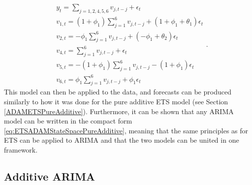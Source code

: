 \documentclass[
]{book}
\theoremstyle{definition}
\theoremstyle{definition}
\theoremstyle{definition}
\theoremstyle{definition}
\theoremstyle{remark}
\begin{document}
\begin{equation*}
    \begin{aligned}
    &{y}_{t} = \sum_{j=1,2,4,5,6} v_{j,t-j} + \epsilon_t \\
    & v_{1,t} = (1+\phi_1) \sum_{j=1}^6 v_{j,t-j} + (1+\phi_1+\theta_1) \epsilon_t \\
    & v_{2,t} = -\phi_1 \sum_{j=1}^6 v_{j,t-j} + (-\phi_1+\theta_2) \epsilon_t \\
    & v_{4,t} = \sum_{j=1}^6 v_{j,t-j} + \epsilon_t \\
    & v_{5,t} = -(1+\phi_1) \sum_{j=1}^6 v_{j,t-j} -(1+\phi_1) \epsilon_t \\
    & v_{6,t} = \phi_1 \sum_{j=1}^6 v_{j,t-j} + \phi_1 \epsilon_t
    \end{aligned} .
\end{equation*}
This model can then be applied to the data, and forecasts can be produced similarly to how it was done for the pure additive ETS model (see Section \ref{ADAMETSPureAdditive}). Furthermore, it can be shown that any ARIMA model can be written in the compact form \eqref{eq:ETSADAMStateSpacePureAdditive}, meaning that the same principles as for ETS can be applied to ARIMA and that the two models can be united in one framework.

\hypertarget{StateSpaceARIMAAdditive}{%
\subsection{Additive ARIMA}\label{StateSpaceARIMAAdditive}}
\end{document}

